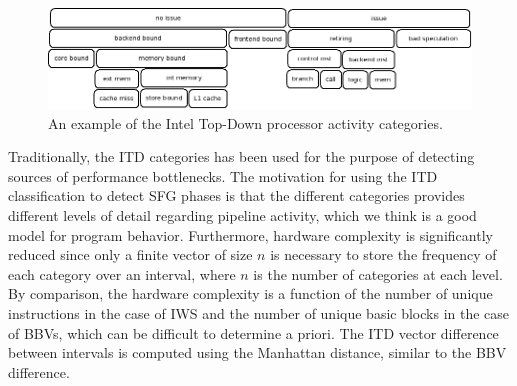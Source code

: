 \begin{figure}[htbp]
  \begin{center}
\includegraphics[width=0.99\columnwidth]{figs/topdown2}
  \end{center}
  \caption{An example of the Intel Top-Down processor activity categories.}
  \label{fig:topdown2}
\end{figure}

Traditionally, the ITD categories has been used for the purpose of detecting sources of performance bottlenecks. The motivation for using the ITD classification to detect SFG phases is that the different categories provides different levels of detail regarding pipeline activity, which we think is a good model for program behavior. Furthermore, hardware complexity is significantly reduced since only a finite vector of size $n$ is necessary to store the frequency of each category over an interval, where $n$ is the number of categories at each level. By comparison, the hardware complexity is a function of the number of unique instructions in the case of IWS and the number of unique basic blocks in the case of BBVs, which can be difficult to determine a priori. The ITD vector difference between intervals is computed using the Manhattan distance, similar to the BBV difference.



